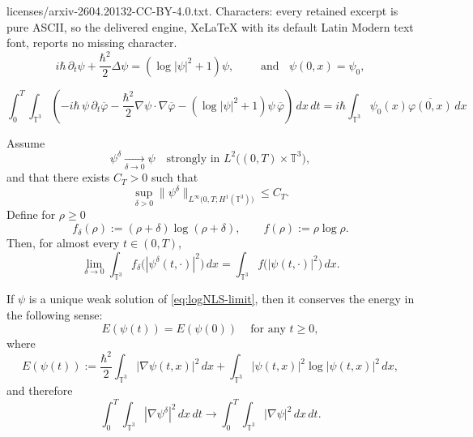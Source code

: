 \documentclass[10pt,a4paper]{amsart}
\begin{document}
licenses/arxiv-2604.20132-CC-BY-4.0.txt. Characters: every retained excerpt is pure ASCII, so the delivered engine, XeLaTeX with its default Latin Modern text font, reports no missing character.
\begin{equation}\label{eq:logNLS-limit}
i\hbar\,\partial_t\psi+\frac{\hbar^2}{2}\Delta\psi
=
(\log|\psi|^2+1)\psi,\quad\quad\text{ and }\;\; \psi(0,x)=\psi_0,
\end{equation}

\begin{equation}\label{eq:weak-form-limit}
\int_0^T\!\!\int_{\mathbb{T}^3}
\left(
-i\hbar\,\psi\,\partial_t\overline{\varphi}
-\frac{\hbar^2}{2}\nabla\psi\cdot\nabla\overline{\varphi}
-(\log|\psi|^2+1)\psi\,\overline{\varphi}
\right)\,dx\,dt
=
i\hbar\int_{\mathbb{T}^3}\psi_0(x)\overline{\varphi(0,x)}\,dx
\end{equation}

\begin{lemma}
\label{lemma:local-nonlinear-energy-convergence}
Assume
\[
\psi^{\delta}\xrightarrow[\delta\to 0]{}
\psi
\quad\text{strongly in }L^{2}\!\bigl((0,T)\times \mathbb{T}^3\bigr),
\]
and that there exists \(C_{T}>0\) such that
\[
\sup_{\delta>0}\|\psi^{\delta}\|_{L^{\infty}\!\bigl(0,T;H^{1}(\mathbb{T}^3)\bigr)}\le C_{T}.
\]
Define for \(\rho\ge 0\)
\[
f_{\delta}(\rho):=(\rho+\delta)\log(\rho+\delta),\qquad
f(\rho):=\rho\log\rho .
\]
Then, for almost every \(t\in(0,T)\),
\[
\lim_{\delta\to0}\int_{\mathbb{T}^3}
f_{\delta}\!\bigl(|\psi^{\delta}(t,\cdot)|^{2}\bigr)\,dx
=
\int_{\mathbb{T}^3}
f\!\bigl(|\psi(t,\cdot)|^{2}\bigr)\,dx .
\]
\end{lemma}

\begin{proposition}
\label{proposition-energy equality}
If   \(\psi\) is a unique weak solution of \eqref{eq:logNLS-limit}, then it conserves the energy in the following sense: 
\begin{equation}
\label{energy equality for Sho}
E(\psi(t))=E(\psi(0))\;\;\;\text{ for any } t\geq 0,\end{equation}
where 
\[
E(\psi(t))
:=
\frac{\hbar^2}{2}\int_{\mathbb{T}^3}|\nabla\psi(t,x)|^2\,dx
+
\int_{\mathbb{T}^3}|\psi(t,x)|^2\log|\psi(t,x)|^2\,dx,
\]
 and therefore
\begin{equation}\label{eq:local-kinetic-conv}
\int_0^T\int_{\mathbb{T}^3}|\nabla\psi^\delta|^2\,dx\,dt
\to
\int_0^T\int_{\mathbb{T}^3}|\nabla\psi|^2\,dx\,dt.
\end{equation}

\end{proposition}
\end{document}
